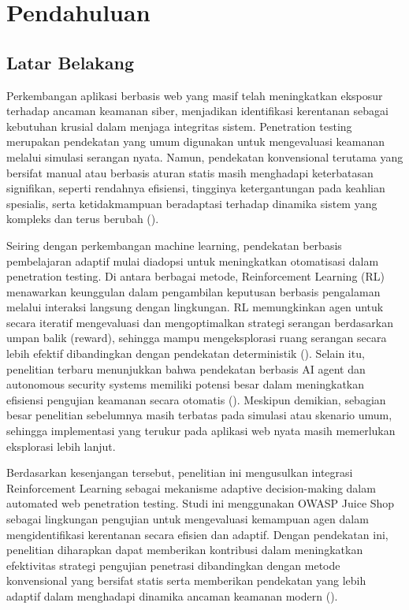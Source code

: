 \chapter{Pendahuluan}

\section{Latar Belakang}

Perkembangan aplikasi berbasis web yang masif telah meningkatkan eksposur terhadap ancaman keamanan siber, menjadikan identifikasi kerentanan sebagai kebutuhan krusial dalam menjaga integritas sistem. Penetration testing merupakan pendekatan yang umum digunakan untuk mengevaluasi keamanan melalui simulasi serangan nyata. Namun, pendekatan konvensional terutama yang bersifat manual atau berbasis aturan statis masih menghadapi keterbatasan signifikan, seperti rendahnya efisiensi, tingginya ketergantungan pada keahlian spesialis, serta ketidakmampuan beradaptasi terhadap dinamika sistem yang kompleks dan terus berubah (\cite{zhang2023,kumar2024}).

Seiring dengan perkembangan machine learning, pendekatan berbasis pembelajaran adaptif mulai diadopsi untuk meningkatkan otomatisasi dalam penetration testing. Di antara berbagai metode, Reinforcement Learning (RL) menawarkan keunggulan dalam pengambilan keputusan berbasis pengalaman melalui interaksi langsung dengan lingkungan. RL memungkinkan agen untuk secara iteratif mengevaluasi dan mengoptimalkan strategi serangan berdasarkan umpan balik (reward), sehingga mampu mengeksplorasi ruang serangan secara lebih efektif dibandingkan dengan pendekatan deterministik (\cite{alavizadeh2024,nguyen2023}). Selain itu, penelitian terbaru menunjukkan bahwa pendekatan berbasis AI agent dan autonomous security systems memiliki potensi besar dalam meningkatkan efisiensi pengujian keamanan secara otomatis (\cite{li2025,chen2025}). Meskipun demikian, sebagian besar penelitian sebelumnya masih terbatas pada simulasi atau skenario umum, sehingga implementasi yang terukur pada aplikasi web nyata masih memerlukan eksplorasi lebih lanjut.

Berdasarkan kesenjangan tersebut, penelitian ini mengusulkan integrasi Reinforcement Learning sebagai mekanisme adaptive decision-making dalam automated web penetration testing. Studi ini menggunakan OWASP Juice Shop sebagai lingkungan pengujian untuk mengevaluasi kemampuan agen dalam mengidentifikasi kerentanan secara efisien dan adaptif. Dengan pendekatan ini, penelitian diharapkan dapat memberikan kontribusi dalam meningkatkan efektivitas strategi pengujian penetrasi dibandingkan dengan metode konvensional yang bersifat statis serta memberikan pendekatan yang lebih adaptif dalam menghadapi dinamika ancaman keamanan modern (\cite{singh2024}).

